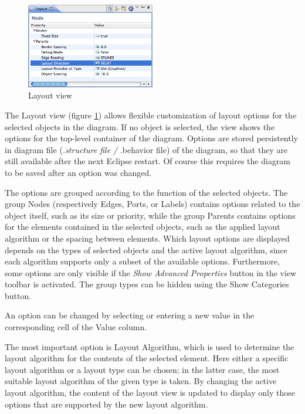 \begin{figure}
\includegraphics[width=0.5\textwidth]{images/043-LayoutView.png}
\caption{Layout view}
\label{fig:layout_view}
\end{figure}

The Layout view (figure \ref{fig:layout_view}) allows flexible customization of layout options for the selected objects in the \eTrice{} 
diagram. If no object is selected, the view shows the options for the top-level container of the diagram. 
Options are stored persistently in diagram file (\emph{.structure file / }.behavior file) of the \eTrice{} 
diagram, so that they are still available after the next Eclipse restart. Of course this requires the 
diagram to be saved after an option was changed.

The options are grouped according to the function of the selected objects. The group Nodes (respectively 
Edges, Ports, or Labels) contains options related to the object itself, such as its size or priority, 
while the group Parents contains options for the elements contained in the selected objects, such as the 
applied layout algorithm or the spacing between elements. Which layout options are displayed depends on 
the types of selected objects and the active layout algorithm, since each algorithm supports only a subset 
of the available options. Furthermore, some options are only visible if the \textit{Show Advanced 
Properties} button in the view toolbar is activated. The group types can be hidden using the Show 
Categories button.

An option can be changed by selecting or entering a new value in the corresponding cell of the Value column.

The most important option is Layout Algorithm, which is used to determine the layout algorithm for the 
contents of the selected element. Here either a specific layout algorithm or a layout type can be chosen; 
in the latter case, the most suitable layout algorithm of the given type is taken. By changing the active 
layout algorithm, the content of the layout view is updated to display only those options that are 
supported by the new layout algorithm.

